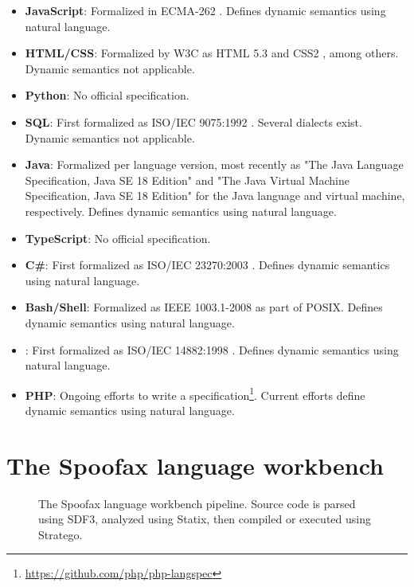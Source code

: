 \begin{itemize}
  \item \textbf{JavaScript}: Formalized in ECMA-262 \cite{ecma1999262}. Defines dynamic semantics using natural language.
  \item \textbf{HTML/CSS}: Formalized by W3C as HTML 5.3 \cite{Moon:21:H} and CSS2 \cite{Lilley:08:CSS}, among others. Dynamic semantics not applicable.
  \item \textbf{Python}: No official specification.
  \item \textbf{SQL}: First formalized as ISO/IEC 9075:1992 \cite{ISO:1992:IITa}. Several dialects exist. Dynamic semantics not applicable.
  \item \textbf{Java}: Formalized per language version, most recently as "The Java Language Specification, Java SE 18 Edition" \cite{java_se_18} and "The Java Virtual Machine Specification, Java SE 18 Edition" \cite{jvm_se_18} for the Java language and virtual machine, respectively. Defines dynamic semantics using natural language.
  \item \textbf{TypeScript}: No official specification.
  \item \textbf{C\#}: First formalized as ISO/IEC 23270:2003 \cite{ISO:2003:IIIb}. Defines dynamic semantics using natural language.
  \item \textbf{Bash/Shell}: Formalized as IEEE 1003.1-2008 \cite{8277153} as part of POSIX. Defines dynamic semantics using natural language.
  \item \textbf{\Cplusplus}: First formalized as ISO/IEC 14882:1998 \cite{ISO:1998:IIP}. Defines dynamic semantics using natural language.
  \item \textbf{PHP}: Ongoing efforts to write a specification\footnote{\url{https://github.com/php/php-langspec}}. Current efforts define dynamic semantics using natural language.
\end{itemize}

\section{The Spoofax language workbench}
\label{sec:background_spoofax}

\begin{figure}
  \caption{The Spoofax language workbench pipeline. Source code is parsed using SDF3, analyzed using Statix, then compiled or executed using Stratego.}
  \label{fig:spoofax_pipeline}
\end{figure}


